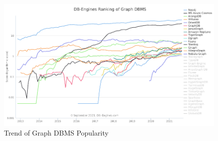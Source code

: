\begin{figure}[H]%
	\centering%
	\includegraphics[width=1\textwidth-4pt,%
		bgcolor=white,%
		cfbox=lightestgray %
			  2pt %
			  0pt %
			  0pt %
	]{images/chapter2/solid2021trends.pdf}%
	\caption[Trend of Graph DBMS Popularity]{Trend of Graph DBMS Popularity}%
	\label{fig:solid2021trends}%
\end{figure}%

